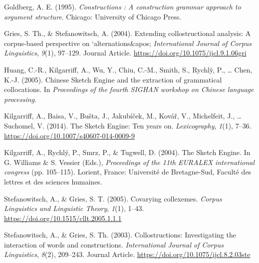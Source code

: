 \hypertarget{refs}{}
\begin{CSLReferences}{1}{0}
\leavevmode{}%
Goldberg, A. E. (1995). \emph{Constructions : A construction grammar
approach to argument structure}. {Chicago}: {University of Chicago
Press}.

\leavevmode{}%
Gries, S. Th., \& Stefanowitsch, A. (2004). Extending collostructional
analysis: {A} corpus-based perspective on `alternations\&apos;
\emph{International Journal of Corpus Linguistics}, \emph{9}(1),
97--129. Journal Article. \url{https://doi.org/10.1075/ijcl.9.1.06gri}

\leavevmode{}%
Huang, C.-R., Kilgarriff, A., Wu, Y., Chiu, C.-M., Smith, S., Rychlỳ,
P., \ldots{} Chen, K.-J. (2005). Chinese {Sketch Engine} and the
extraction of grammatical collocations. In \emph{Proceedings of the
fourth {SIGHAN} workshop on {Chinese} language processing}.

\leavevmode{}%
Kilgarriff, A., Baisa, V., Bušta, J., Jakubíček, M., Kovář, V.,
Michelfeit, J., \ldots{} Suchomel, V. (2014). The {Sketch Engine}: Ten
years on. \emph{Lexicography}, \emph{1}(1), 7--36.
\url{https://doi.org/10.1007/s40607-014-0009-9}

\leavevmode{}%
Kilgarriff, A., Rychlý, P., Smrz, P., \& Tugwell, D. (2004). The {Sketch
Engine}. In G. Williams \& S. Vessier (Eds.), \emph{Proceedings of the
11th {EURALEX} international congress} (pp. 105--115). {Lorient,
France}: {Université de Bretagne-Sud, Faculté des lettres et des
sciences humaines}.

\leavevmode{}%
Stefanowitsch, A., \& Gries, S. T. (2005). Covarying collexemes.
\emph{Corpus Linguistics and Linguistic Theory}, \emph{1}(1), 1--43.
\url{https://doi.org/10.1515/cllt.2005.1.1.1}

\leavevmode{}%
Stefanowitsch, A., \& Gries, S. Th. (2003). Collostructions:
{Investigating} the interaction of words and constructions.
\emph{International Journal of Corpus Linguistics}, \emph{8}(2),
209--243. Journal Article. \url{https://doi.org/10.1075/ijcl.8.2.03ste}

\end{CSLReferences}
